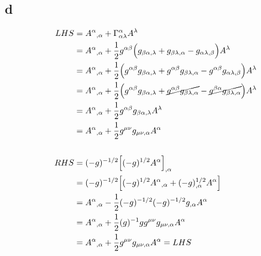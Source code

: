 \documentclass{article}
\begin{document}
\subsection*{d}
\begin{align*}
LHS &= A^\alpha{}_{,\alpha} + \Gamma^{\alpha}_{\alpha\lambda}A^\lambda \\
&= A^\alpha{}_{,\alpha} + \frac{1}{2}g^{\alpha\beta}\Big(g_{\beta\alpha,\lambda} + g_{\beta\lambda, \alpha} - g_{\alpha\lambda,\beta}\Big)A^\lambda \\
&= A^\alpha{}_{,\alpha} + \frac{1}{2}\Big(g^{\alpha\beta}g_{\beta\alpha,\lambda} + g^{\alpha\beta}g_{\beta\lambda, \alpha} -  g^{\alpha\beta}g_{\alpha\lambda,\beta}\Big)A^\lambda \\
&= A^\alpha{}_{,\alpha} + \frac{1}{2}\Big(g^{\alpha\beta}g_{\beta\alpha,\lambda} + \cancel{g^{\alpha\beta}g_{\beta\lambda, \alpha}} -  \cancel{g^{\beta\alpha}g_{\beta\lambda,\alpha}} \Big)A^\lambda  \\
&= A^\alpha{}_{,\alpha} + \frac{1}{2}g^{\alpha\beta}g_{\beta\alpha,\lambda}A^\lambda \\
&= A^\alpha{}_{,\alpha} + \frac{1}{2}g^{\mu\nu}g_{\mu\nu,\alpha}A^\alpha\\\\
RHS &= (-g)^{-1/2}\Big[(-g)^{1/2}A^\alpha\Big]_{,\alpha} \\
&= (-g)^{-1/2}\Big[(-g)^{1/2}A^\alpha{}_{,\alpha} + (-g)^{1/2}_{,\alpha}A^\alpha \Big] \\
& = A^\alpha{}_{,\alpha} - \frac{1}{2}(-g)^{-1/2} (-g)^{-1/2}g_{,\alpha}A^\alpha \\ 
& = A^\alpha{}_{,\alpha} + \frac{1}{2}(g)^{-1}gg^{\mu\nu}g_{\mu\nu,\alpha} A^\alpha \\ 
& = A^\alpha{}_{,\alpha} + \frac{1}{2}g^{\mu\nu}g_{\mu\nu,\alpha} A^\alpha = LHS
\end{align*}
\end{document}
